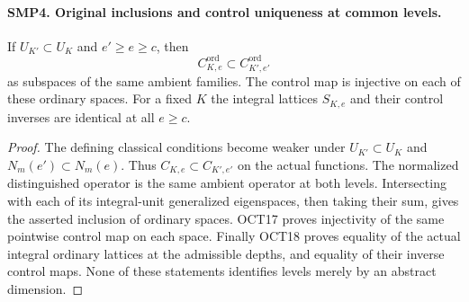 \paragraph{SMP4. Original inclusions and control uniqueness at common levels.}
\label{claim:SMP4}
If $U_{K'}\subset U_K$ and $e'\geq e\geq c$, then
\[
 C^{\mathrm{ord}}_{K,e}\subset C^{\mathrm{ord}}_{K',e'}
\]
as subspaces of the same ambient families.  The control
map is injective on each of these ordinary spaces.
For a fixed $K$ the integral lattices $S_{K,e}$ and
their control inverses are identical at all $e\geq c$.
\begin{proof}
The defining classical conditions become weaker under
$U_{K'}\subset U_K$ and $N_m(e')\subset N_m(e)$.
Thus $C_{K,e}\subset C_{K',e'}$ on the actual
functions.  The normalized distinguished operator is
the same ambient operator at both levels.  Intersecting
with each of its integral-unit generalized eigenspaces,
then taking their sum, gives the asserted inclusion
of ordinary spaces.  OCT17 proves injectivity of the
same pointwise control map on each space.  Finally
OCT18 proves equality of the actual integral ordinary
lattices at the admissible depths, and equality of
their inverse control maps.  None of these statements
identifies levels merely by an abstract dimension.
\end{proof}

